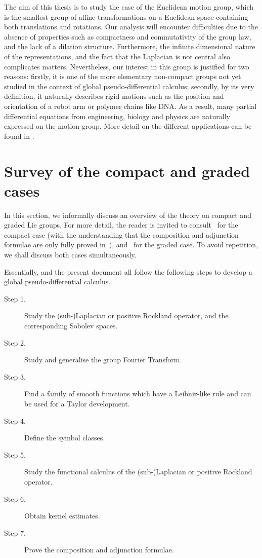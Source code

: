 The aim of this thesis is to study the case of the Euclidean motion group,
which is the smallest group of affine transformations on a Euclidean space containing both translations and rotations.
Our analysis will encounter difficulties due to the absence of properties such as compactness and commutativity of the group law,
and the lack of a dilation structure.
Furthermore, the infinite dimensional nature of the representations,
and the fact that the Laplacian is not central also complicates matters.
Nevertheless, our interest in this group is justified for two reasons:
firstly, it is one of the more elementary non-compact groups not yet studied in the context of global pseudo-differential calculus;
secondly, by its very definition,
it naturally describes rigid motions such as the position and orientation of a robot arm or polymer chains like DNA.
As a result,
many partial differential equations from engineering, biology and physics
are naturally expressed on the motion group.
More detail on the different applications can be found in \cite{ChirikjianWang04,ChirikjianKyatkin00,Chirikjian13}.

\section{Survey of the compact and graded cases}

In this section,
we informally discuss an overview of the theory on compact and graded Lie groups.
For more detail,
the reader is invited to consult~\cite{RuzhanskyTurunen10} for the compact case
(with the understanding that the composition and adjunction formulae are only fully proved in~\cite{Fischer2015}),
and~\cite{FischerRuzhansky16} for the graded case.
To avoid repetition,
we shall discuss both cases simultaneously.

Essentially,
\cite{Fischer2015,FischerRuzhansky16} and the present document
all follow the following steps
to develop a global pseudo-differential calculus.

\begin{description}
    \item[Step 1.] Study the (sub-)Laplacian or positive Rockland operator,
        and the corresponding Sobolev spaces.
    \item[Step 2.] Study and generalise the group Fourier Transform.
    \item[Step 3.] Find a family of smooth functions which have a Leibniz-like rule and can be used for a Taylor development.
    \item[Step 4.] Define the symbol classes.
    \item[Step 5.] Study the functional calculus of the (sub-)Laplacian or positive Rockland operator.
    \item[Step 6.] Obtain kernel estimates.
    \item[Step 7.] Prove the composition and adjunction formulae.
\end{description}

